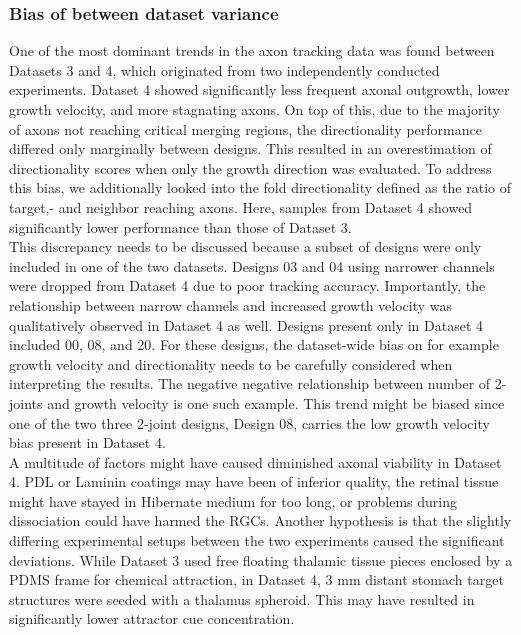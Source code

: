 \subsubsection{Bias of between dataset variance}
One of the most dominant trends in the axon tracking data was found between
Datasets 3 and 4, which originated from two independently conducted experiments.
Dataset 4 showed significantly less frequent axonal outgrowth, lower growth
velocity, and more stagnating axons. On top of this, due to the majority of
axons not reaching critical merging regions, the directionality performance
differed only marginally between designs. This resulted in an overestimation of
directionality scores when only the growth direction was evaluated. To address
this bias, we additionally looked into the fold directionality defined as the
ratio of target,- and neighbor reaching axons. Here, samples from Dataset 4
showed significantly lower performance than those of Dataset 3. \\
This discrepancy needs to be discussed because a subset of designs were only
included in one of the two datasets. Designs 03 and 04 using narrower channels
were dropped from Dataset 4 due to poor tracking accuracy. Importantly, the
relationship between narrow channels and increased growth velocity was
qualitatively observed in Dataset 4 as well. Designs present only in Dataset 4
included 00, 08, and 20. For these designs, the dataset-wide bias on for example
growth velocity and directionality needs to be carefully considered when
interpreting the results. The negative negative relationship between number of
2-joints and growth velocity is one such example. This trend might be
biased since one of the two three 2-joint designs, Design 08, carries the low
growth velocity bias present in Dataset 4. \\

A multitude of factors might have caused diminished axonal viability in Dataset
4. PDL or Laminin coatings may have been of inferior quality, the retinal tissue
might have stayed in Hibernate medium for too long, or problems during
dissociation could have harmed the RGCs. Another hypothesis is that the slightly
differing experimental setups between the two experiments caused the significant
deviations. While Dataset 3 used free floating thalamic tissue pieces enclosed
by a PDMS frame for chemical attraction, in Dataset 4, 3 mm distant stomach
target structures were seeded with a thalamus spheroid. This may have resulted
in significantly lower attractor cue concentration. 

